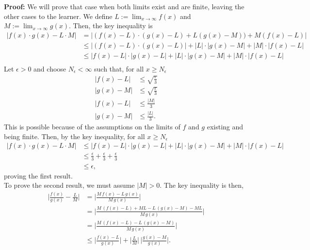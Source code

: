 \textbf{Proof:} We will prove that case when both limits exist and are finite, leaving the other cases to the learner. We define $L:= \lim_{x \to \infty} f(x)$ and  $M:= \lim_{x \to \infty} g(x)$. Then, the key inequality is
\begin{align*}
   \big| f(x) \cdot g(x) - L \cdot M \big| & = \big| \left( f(x) -L \right) \cdot \left(g(x) - L\right) + L \left(g(x) - M \right)) +  M \left( f(x) - L \right)\big| \\[1em]
   &\le \big| \left( f(x) -L \right) \cdot \left(g(x) - L\right) \big| + \big|L \big| \cdot \big|g(x) - M \big| +  \big|M\big| \cdot \big|f(x) - L \big| \\[1em] 
   &\le \big| f(x) -L \big| \cdot \big| g(x) - L \big|  + \big| L \big| \cdot \big| g(x) - M \big| +  \big| M \big| \cdot \big| f(x) - L \big| \\[1em] 
\end{align*}
Let $\epsilon >0$ and choose $N_\epsilon < \infty$ such that, for all $x \ge N_\epsilon$
\begin{align*}
    \big| f(x) -L \big| & \le \sqrt{ \frac{\epsilon}{3} } \\[1em]
   \big| g(x) -M \big| & \le \sqrt{ \frac{\epsilon}{3} } \\[1em]
   \big| f(x) -L \big| & \le \frac{|M|}{3}\\[1em]
    \big| g(x) -M \big| & \le \frac{|L|}{3}.
\end{align*}
This is possible because of the assumptions on the limits of $f$ and $g$ existing and being finite. Then,  by the key inequality, for all  $x \ge N_\epsilon$
\begin{align*}
   \big| f(x) \cdot g(x) - L \cdot M \big| &\le \big| f(x) -L \big| \cdot \big| g(x) - L \big|  + \big| L \big| \cdot \big| g(x) - M \big| +  \big| M \big| \cdot \big| f(x) - L \big| \\[1em] 
   &\le \frac{\epsilon}{3} +  \frac{\epsilon}{3} +  \frac{\epsilon}{3} \\
   & \le \epsilon,
\end{align*}
proving the first result. \\

To prove the second result, we must assume $|M|>0$. The key inequality is then,
\begin{align*}
    \Big|\frac{f(x)}{g(x)} - \frac{L}{M} \Big|& =  \Big|\frac{M\, f(x) - L \, g(x)}{M\, g(x)}  \Big| \\[1em]
    &= \Big|\frac{M\,\left( f(x) -L \right) + ML - L \, \left(g(x) - M \right)  - ML}{M\, g(x)}  \Big| \\[1em]
    &= \Big|\frac{M\,\left( f(x) -L \right) - L \, \left(g(x) - M \right)}{M\, g(x)}  \Big| \\[1em]
    &\le \Big|\frac{f(x) -L}{g(x)}  \Big| + \Big|  \frac{L}{M} \Big| \, \Big|\frac{g(x) - M }{g(x)}  \Big|.
\end{align*}

